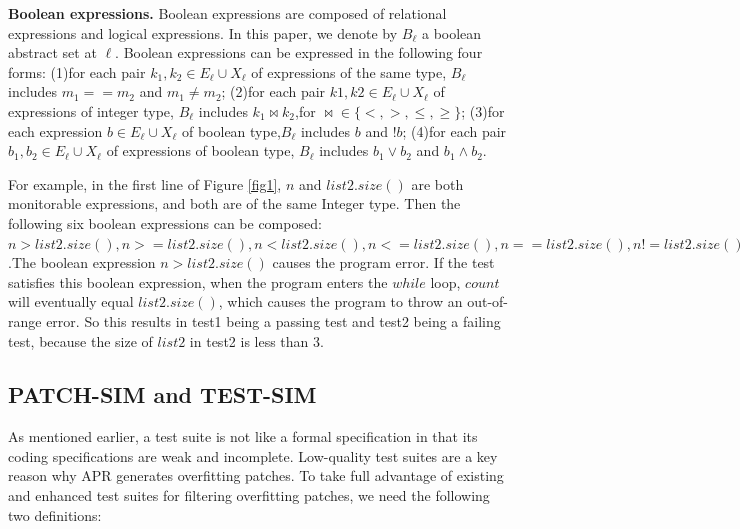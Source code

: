 \textbf{Boolean expressions.} Boolean expressions are composed of relational expressions and logical expressions. In this paper, we denote by $B_\ell$ a boolean abstract set at $\ell$. Boolean expressions can be expressed in the following four forms: (1)for each pair $k_1,k_2 \in E_\ell \cup X_\ell$ of expressions of the same type, $B_\ell$ includes $m_1 == m_2$ and $m_1 \neq m_2$; (2)for each pair $k1,k2 \in E_\ell \cup X_\ell$ of expressions of integer type, $B_\ell$ includes $k_1 \bowtie k_2$,for $ \bowtie \in \{ <,>,\leq,\ge \}$; (3)for each expression $b \in E_\ell \cup X_\ell$ of boolean type,$B_\ell$ includes $b$ and $!b$; (4)for each pair $b_1,b_2 \in E_\ell \cup X_\ell$ of expressions of boolean type, $B_\ell$ includes $b_1 \vee b_2$ and $b_1\wedge b_2$.

For example, in the first line of Figure \ref{fig1}, $n$ and $list2.size()$ are both monitorable expressions, and both are of the same Integer type. Then the following six boolean expressions can be composed:  $n>list2.size(), n>=list2.size(), n<list2.size(), n<=list2.size(), n==list2.size(), n!=list2.size()$.The boolean expression $n>list2.size()$ causes the program error. If the test satisfies this boolean expression, when the program enters the $while$ loop, $count$ will eventually equal $list2.size()$, which causes the program to throw an out-of-range error. So this results in test1 being a passing test and test2 being a failing test, because the size of $list2$ in test2 is less than 3.

\subsection{PATCH-SIM and TEST-SIM} \label{3.2}
As mentioned earlier, a test suite is not like a formal specification in that its coding specifications are weak and incomplete. Low-quality test suites are a key reason why APR generates overfitting patches. To take full advantage of existing and enhanced test suites for filtering overfitting patches, we need the following two definitions:

